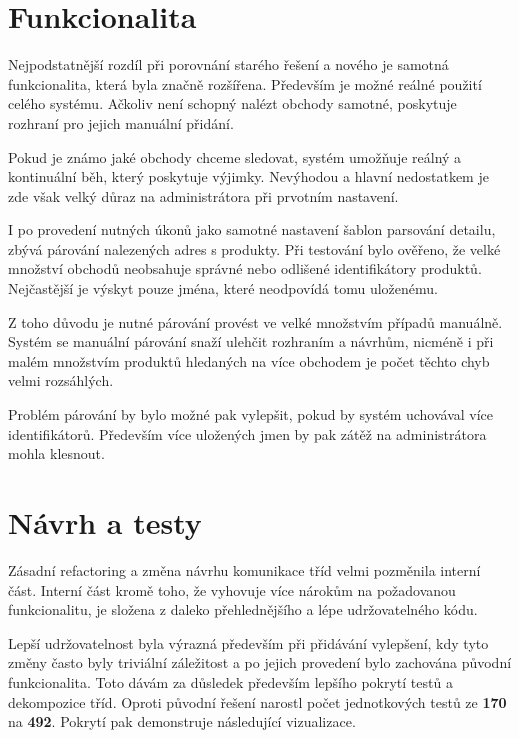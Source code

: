 \documentclass[thesis=B,czech]{FITthesis}[2012/06/26]
\begin{document}
\section{Funkcionalita}

Nejpodstatnější rozdíl při porovnání starého řešení a nového je samotná funkcionalita, která byla značně rozšířena. Především je možné
reálné použití celého systému. Ačkoliv není schopný nalézt obchody samotné, poskytuje rozhraní pro jejich manuální přidání.
\par
Pokud je známo jaké obchody chceme sledovat, systém umožňuje reálný a kontinuální běh, který poskytuje výjimky. Nevýhodou a hlavní nedostatkem
je zde však velký důraz na administrátora při prvotním nastavení. 
\par
I po provedení nutných úkonů jako samotné nastavení šablon parsování detailu, zbývá párování nalezených adres s produkty. Při testování
bylo ověřeno, že velké množství obchodů neobsahuje správné nebo odlišené identifikátory produktů. Nejčastější je výskyt pouze jména, které
neodpovídá tomu uloženému.
\par
Z toho důvodu je nutné párování
provést ve velké množstvím případů manuálně. Systém se manuální párování snaží ulehčit rozhraním a návrhům, nicméně i při malém množstvím produktů
hledaných na více obchodem je počet těchto chyb velmi rozsáhlých. 
\par
Problém párování by bylo možné pak vylepšit, pokud by systém uchovával více identifikátorů. Především více uložených jmen by pak zátěž na administrátora mohla klesnout.

\section{Návrh a testy}
Zásadní refactoring a změna návrhu komunikace tříd velmi pozměnila interní část. Interní část kromě toho, že vyhovuje
více nárokům na požadovanou funkcionalitu, je složena z daleko přehlednějšího a lépe udržovatelného kódu. 
\par
Lepší udržovatelnost byla výrazná především při přidávání vylepšení, kdy tyto změny často byly triviální záležitost a po jejich provedení
bylo zachována původní funkcionalita. Toto dávám za důsledek především lepšího pokrytí testů a dekompozice tříd. Oproti původní řešení narostl počet jednotkových testů ze \textbf{170} na \textbf{492}. Pokrytí pak demonstruje následující vizualizace.
\end{document}
